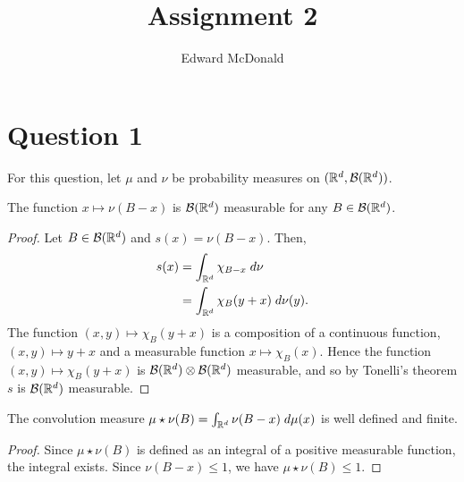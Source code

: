 \documentclass{unswmaths}
\begin{document}
\subject{Measure Theory}
\author{Edward McDonald}
\title{Assignment 2}


\setlength\parindent{0pt}


\newcommand{\Bor}{\mathcal{B}}
\newcommand{\sdiff}{\bigtriangleup}
\newcommand{\Expect}{{\rm I\kern-.3em E}}
\newcommand{\Prob}{{\rm I\kern-.3em P}}
\newcommand{\Log}{\operatorname{Log}}


\unswtitle{}


\section*{Question 1}
For this question, let $\mu$ and $\nu$ be probability measures
    on $(\Rl^d,\Bor(\Rl^d))$.

\begin{lemma}
    The function $x\mapsto \nu(B-x)$ is $\Bor(\Rl^d)$
    measurable for any $B \in \Bor(\Rl^d)$.
\end{lemma} 
\begin{proof}
    Let $B \in \Bor(\Rl^d)$ and $s(x) = \nu(B-x)$. Then,
    \begin{align*}
        s(x) &= \int_{\mathbb{R}^d} \chi_{B-x}\;d\nu\\
        &= \int_{\mathbb{R}^d} \chi_B(y+x)\;d\nu(y).
    \end{align*}
    The function $(x,y)\mapsto \chi_{B}(y+x)$
    is a composition of a continuous function, $(x,y)\mapsto y+x$
    and a measurable function $x\mapsto \chi_B(x)$. 
    Hence the function $(x,y)\mapsto \chi_{B}(y+x)$
    is $\Bor(\Rl^d)\otimes\Bor(\Rl^d)$ measurable,
    and so by Tonelli's theorem $s$ is $\Bor(\Rl^d)$
    measurable.
\end{proof}

\begin{lemma}
    The convolution measure $\mu\star\nu(B) = \int_{\mathbb{R}^d} \nu(B-x)\;d\mu(x)$
    is well defined and finite.
\end{lemma}
\begin{proof}
    Since $\mu\star\nu(B)$ is defined as an integral of a positive
    measurable function, the integral exists. Since $\nu(B-x) \leq 1$,
    we have $\mu\star\nu(B) \leq 1$.
\end{proof}
\end{document}
